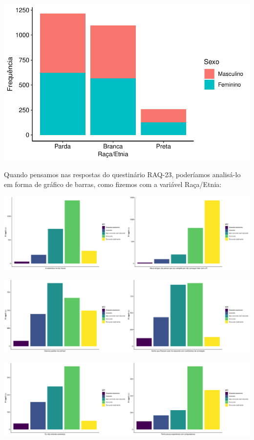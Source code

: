\documentclass[
  letterpaper,
  DIV=11,
  numbers=noendperiod]{scrartcl}
\begin{document}
\includegraphics{descritiva_files/figure-pdf/unnamed-chunk-25-1.pdf}

Quando pensamos nas respostas do questinário RAQ-23, poderíamos
analisá-lo em forma de gráfico de barras, como fizemos com a variável
Raça/Etnia:

\includegraphics{descritiva_files/figure-pdf/unnamed-chunk-26-1.pdf}

\includegraphics{descritiva_files/figure-pdf/unnamed-chunk-26-2.pdf}

\includegraphics{descritiva_files/figure-pdf/unnamed-chunk-26-3.pdf}
\end{document}
